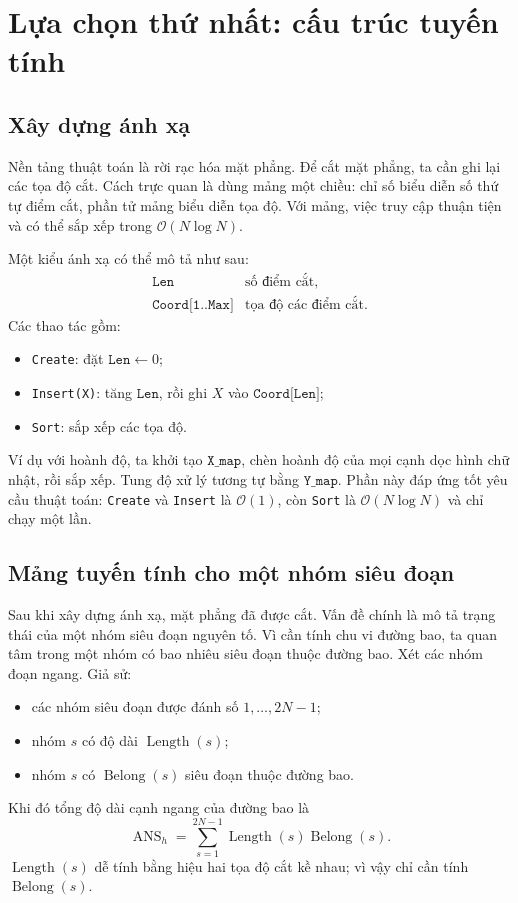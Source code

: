 \documentclass[11pt]{article}
\newcommand{\Oh}{\mathcal{O}}
\begin{document}
\section{Lựa chọn thứ nhất: cấu trúc tuyến tính}

\subsection{Xây dựng ánh xạ}

Nền tảng thuật toán là rời rạc hóa mặt phẳng. Để cắt mặt phẳng, ta cần ghi lại
các tọa độ cắt. Cách trực quan là dùng mảng một chiều: chỉ số biểu diễn số thứ
tự điểm cắt, phần tử mảng biểu diễn tọa độ. Với mảng, việc truy cập thuận tiện
và có thể sắp xếp trong \(\Oh(N\log N)\).

Một kiểu ánh xạ có thể mô tả như sau:
\[
\begin{array}{ll}
\texttt{Len} & \text{số điểm cắt},\\
\texttt{Coord[1..Max]} & \text{tọa độ các điểm cắt}.
\end{array}
\]
Các thao tác gồm:
\begin{itemize}
  \item \texttt{Create}: đặt \(\texttt{Len}\leftarrow0\);
  \item \texttt{Insert(X)}: tăng \(\texttt{Len}\), rồi ghi \(X\) vào
  \(\texttt{Coord[Len]}\);
  \item \texttt{Sort}: sắp xếp các tọa độ.
\end{itemize}

Ví dụ với hoành độ, ta khởi tạo \(\texttt{X\_map}\), chèn hoành độ của mọi
cạnh dọc hình chữ nhật, rồi sắp xếp. Tung độ xử lý tương tự bằng
\(\texttt{Y\_map}\). Phần này đáp ứng tốt yêu cầu thuật toán: \texttt{Create}
và \texttt{Insert} là \(\Oh(1)\), còn \texttt{Sort} là \(\Oh(N\log N)\) và
chỉ chạy một lần.

\subsection{Mảng tuyến tính cho một nhóm siêu đoạn}

Sau khi xây dựng ánh xạ, mặt phẳng đã được cắt. Vấn đề chính là mô tả trạng
thái của một nhóm siêu đoạn nguyên tố. Vì cần tính chu vi đường bao, ta quan
tâm trong một nhóm có bao nhiêu siêu đoạn thuộc đường bao. Xét các nhóm đoạn
ngang. Giả sử:
\begin{itemize}
  \item các nhóm siêu đoạn được đánh số \(1,\ldots,2N-1\);
  \item nhóm \(s\) có độ dài \(\operatorname{Length}(s)\);
  \item nhóm \(s\) có \(\operatorname{Belong}(s)\) siêu đoạn thuộc đường bao.
\end{itemize}
Khi đó tổng độ dài cạnh ngang của đường bao là
\[
  \operatorname{ANS}_h=
  \sum_{s=1}^{2N-1}\operatorname{Length}(s)\operatorname{Belong}(s).
\]
\(\operatorname{Length}(s)\) dễ tính bằng hiệu hai tọa độ cắt kề nhau; vì vậy
chỉ cần tính \(\operatorname{Belong}(s)\).
\end{document}
